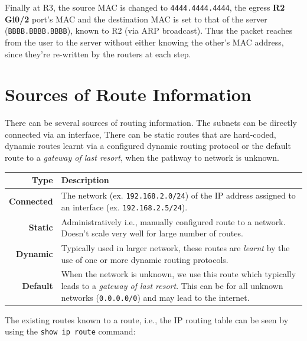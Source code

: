 Finally at R3, the source MAC is changed to \verb|4444.4444.4444|, the egress \textbf{R2 Gi0/2} port's MAC and the destination MAC is set to that of the server (\verb|BBBB.BBBB.BBBB|), known to R2 (via ARP broadcast). Thus the packet reaches from the user to the server without either knowing the other's MAC address, since they're re-written by the routers at each step. 

\section{Sources of Route Information}
There can be several sources of routing information. The subnets can be directly connected via an interface, There can be static routes that are hard-coded, dynamic routes learnt via a configured dynamic routing protocol or the default route to a \textit{gateway of last resort}, when the pathway to network is unknown. 

\vspace{-10pt}
\noindent
\begin{center}
	\begin{tabular}{rm{}}
		\toprule
		\textbf{Type} &\textbf{Description} \\
		\midrule
		\textbf{Connected} &The network (ex. \verb|192.168.2.0/24|) of the IP address assigned to an interface (ex. \verb|192.168.2.5/24|).\\
		\textbf{Static} &Administratively i.e., manually configured route to a network. Doesn't scale very well for large number of routes.\\
		\textbf{Dynamic} &Typically used in larger network, these routes are \textit{learnt} by the use of one or more dynamic routing protocols. \\
		\textbf{Default} &When the network is unknown, we use this route which typically leads to a \textit{gateway of last resort}. This can be for all unknown networks (\verb|0.0.0.0/0|) and may lead to the internet.\\		
		\bottomrule
	\end{tabular}
\end{center}

\noindent
The existing routes known to a route, i.e., the IP routing table can be seen by using the \verb|show ip route| command:

